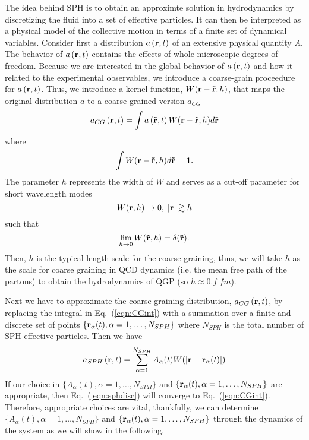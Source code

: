 \documentclass[aps,article]{revtex4}
\begin{document}
The idea behind SPH is to obtain an approximte solution in hydrodynamics by discretizing the fluid into a set of effective particles. It can then be interpreted as a physical model of the collective motion in terms of a finite set of dynamical variables. Consider first a distribution $a\left({\bf r},t\right)$ of an extensive physical quantity $A$. The behavior of $a\left({\bf r},t\right)$ contains the effects of whole microscopic degrees of freedom. Because we are interested in the global behavior of $a\left({\bf r},t\right)$ and how it related to the experimental observables, we introduce a coarse-grain proceedure for $a\left({\bf r},t\right)$.  Thus, we introduce a kernel function, $W({\bf r}-{\bf \tilde{r}},h)$, that maps the original distribution $a$ to a coarse-grained version $a_{CG}$
\begin{equation}\label{eqn:CGint}
a_{CG}\left({\bf r},t\right)=\int a\left({\bf \tilde{r}},t\right)W({\bf r}-{\bf \tilde{r}},h)d{\bf \tilde{r}}
\end{equation}
where 
\begin{equation}\label{eqn:normalizeW}
\int W({\bf r}-{\bf \tilde{r}},h)d{\bf \tilde{r}}={\bf 1}.
\end{equation}
The parameter $h$ represents the width of $W$ and serves as a cut-off parameter for short wavelength modes
\begin{equation}
W({\bf r},h)\rightarrow 0,\;|{\bf r}|\gtrsim h
\end{equation}
such that
\begin{equation}
\lim_{h\rightarrow 0} W({\bf \tilde{r}},h)=\delta({\bf \tilde{r}}).
\end{equation}
Then, $h$ is the typical length scale for the coarse-graining, thus, we will take $h$ as the scale for coarse graining in QCD dynamics (i.e. the mean free path of the partons) to obtain the hydrodynamics of QGP (so $h\approx 0.f\;fm$). 


Next we have to approximate the coarse-graining distribution, $a_{CG}\left({\bf r},t\right)$, by replacing the integral in Eq.\ (\ref{eqn:CGint}) with a summation over a finite and discrete set of points $\{{\bf r}_{\alpha}(t),\alpha=1,\dots,N_{SPH}\}$ where $N_{SPH}$ is the total number of SPH effective particles.  Then we have
\begin{equation}\label{eqn:sphdisc}
a_{SPH}\left({\bf r},t\right)=\sum_{\alpha=1}^{N_{SPH}}A_{\alpha}(t)W(|{\bf r}-{\bf r}_{\alpha}(t)|)
\end{equation} 
If our choice in $\{A_{\alpha}(t),\alpha=1,\dots,N_{SPH}\}$ and $\{{\bf r}_{\alpha}(t),\alpha=1,\dots,N_{SPH}\}$ are appropriate, then Eq.\ (\ref{eqn:sphdisc}) will converge to Eq.\ (\ref{eqn:CGint}).  Therefore, appropriate choices are vital, thankfully, we can determine $\{A_{\alpha}(t),\alpha=1,\dots,N_{SPH}\}$ and $\{{\bf r}_{\alpha}(t),\alpha=1,\dots,N_{SPH}\}$ through the dynamics of the system as we will show in the following. 
\end{document}
